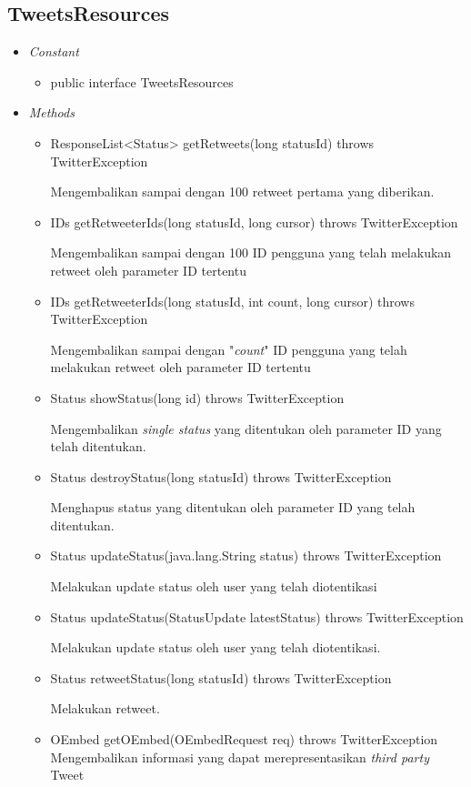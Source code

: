 	\subsection{TweetsResources}
	\begin{itemize}
		\item \textit{Constant}
		
			\begin{itemize}
				\item public interface TweetsResources
			\end{itemize}
		\item \textit{Methods}
		
		\begin{itemize}
			\item ResponseList<Status> getRetweets(long statusId) throws TwitterException
			
			Mengembalikan sampai dengan 100 retweet pertama yang diberikan.
			\item IDs getRetweeterIds(long statusId, long cursor) throws TwitterException
			
			Mengembalikan sampai dengan 100 ID pengguna yang telah melakukan retweet oleh parameter ID tertentu
			\item IDs getRetweeterIds(long statusId, int count, long cursor) throws TwitterException
			
			Mengembalikan sampai dengan "\textit{count}" ID pengguna yang telah melakukan retweet oleh parameter ID tertentu
			\item Status showStatus(long id) throws TwitterException
			
			Mengembalikan \textit{single status} yang ditentukan oleh parameter ID yang telah ditentukan.
			\item Status destroyStatus(long statusId) throws TwitterException
			
			Menghapus status yang ditentukan oleh parameter ID yang telah ditentukan.
			\item Status updateStatus(java.lang.String status) throws TwitterException
			
			Melakukan update status oleh user yang telah diotentikasi
			\item Status updateStatus(StatusUpdate latestStatus) throws TwitterException
			
			Melakukan update status oleh user yang telah diotentikasi.
			\item Status retweetStatus(long statusId) throws TwitterException
			
			Melakukan retweet.
			\item OEmbed getOEmbed(OEmbedRequest req) throws TwitterException
			Mengembalikan informasi yang dapat merepresentasikan \textit{third party} Tweet
			

\end{itemize}
\end{itemize}
